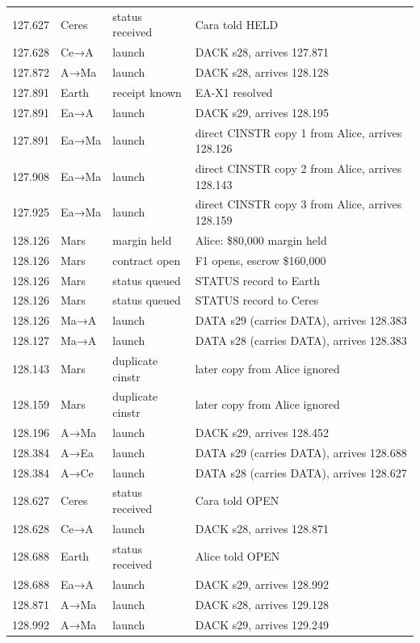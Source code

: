 \documentclass[10pt,letterpaper]{article}
\begin{document}
{\begin{longtable}{@{}rll>{\raggedright\arraybackslash}p{8.2cm}@{}}
127.627 & Ceres & status received & Cara told HELD \\
127.628 & Ce→A & launch & DACK s28, arrives 127.871 \\
127.872 & A→Ma & launch & DACK s28, arrives 128.128 \\
127.891 & Earth & receipt known & EA-X1 resolved \\
127.891 & Ea→A & launch & DACK s29, arrives 128.195 \\
127.891 & Ea→Ma & launch & direct CINSTR copy 1 from Alice, arrives 128.126 \\
127.908 & Ea→Ma & launch & direct CINSTR copy 2 from Alice, arrives 128.143 \\
127.925 & Ea→Ma & launch & direct CINSTR copy 3 from Alice, arrives 128.159 \\
128.126 & Mars & margin held & Alice: \$80,000 margin held \\
128.126 & Mars & contract open & F1 opens, escrow \$160,000 \\
128.126 & Mars & status queued & STATUS record to Earth \\
128.126 & Mars & status queued & STATUS record to Ceres \\
128.126 & Ma→A & launch & DATA s29 (carries DATA), arrives 128.383 \\
128.127 & Ma→A & launch & DATA s28 (carries DATA), arrives 128.383 \\
128.143 & Mars & duplicate cinstr & later copy from Alice ignored \\
128.159 & Mars & duplicate cinstr & later copy from Alice ignored \\
128.196 & A→Ma & launch & DACK s29, arrives 128.452 \\
128.384 & A→Ea & launch & DATA s29 (carries DATA), arrives 128.688 \\
128.384 & A→Ce & launch & DATA s28 (carries DATA), arrives 128.627 \\
128.627 & Ceres & status received & Cara told OPEN \\
128.628 & Ce→A & launch & DACK s28, arrives 128.871 \\
128.688 & Earth & status received & Alice told OPEN \\
128.688 & Ea→A & launch & DACK s29, arrives 128.992 \\
128.871 & A→Ma & launch & DACK s28, arrives 129.128 \\
128.992 & A→Ma & launch & DACK s29, arrives 129.249 \\
\end{longtable}}
\end{document}
